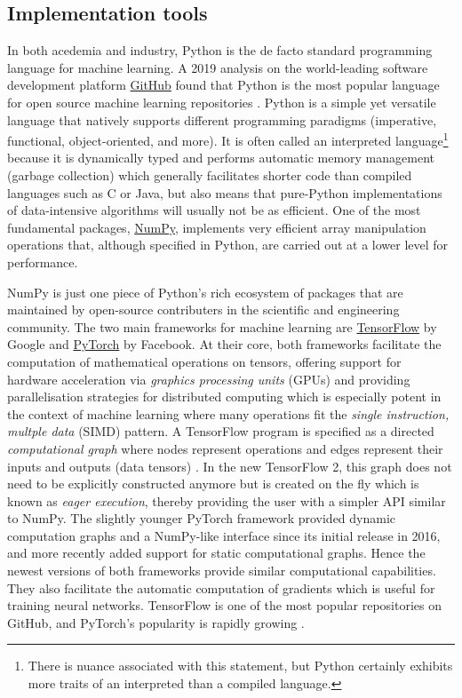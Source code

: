 \subsection{Implementation tools}
In both acedemia and industry, Python is the de facto standard programming language for machine learning. 
A 2019 analysis on the world-leading software development platform \href{https://www.github.com/}{GitHub} found that Python is the most popular language for open source machine learning repositories \cite{elliott2019}.
Python is a simple yet versatile language that natively supports different programming paradigms (imperative, functional, object-oriented, and more).
It is often called an interpreted language\footnote{There is nuance associated with this statement, but Python certainly exhibits more traits of an interpreted than a compiled language.} because it is dynamically typed and performs automatic memory management (garbage collection) which generally facilitates shorter code than compiled languages such as C or Java, but also means that pure-Python implementations of data-intensive algorithms will usually not be as efficient.
One of the most fundamental packages, \href{https://numpy.org/}{NumPy}, implements very efficient array manipulation operations that, although specified in Python, are carried out at a lower level for performance.

NumPy is just one piece of Python's rich ecosystem of packages that are maintained by open-source contributers in the scientific and engineering community.
The two main frameworks for machine learning are \href{https://www.tensorflow.org/}{TensorFlow} by Google and \href{https://www.pytorch.org/}{PyTorch} by Facebook. 
At their core, both frameworks facilitate the computation of mathematical operations on tensors, offering support for hardware acceleration via \textit{graphics processing units} (GPUs) and providing parallelisation strategies for distributed computing which is especially potent in the context of machine learning where many operations fit the \textit{single instruction, multple data} (SIMD) pattern.
A TensorFlow program is specified as a directed \textit{computational graph} where nodes represent operations and edges represent their inputs and outputs (data tensors) \cite{tensorflow2015whitepaper}.
In the new TensorFlow 2, this graph does not need to be explicitly constructed anymore but is created on the fly which is known as \textit{eager execution}, thereby providing the user with a simpler API similar to NumPy.
The slightly younger PyTorch framework provided dynamic computation graphs and a NumPy-like interface since its initial release in 2016, and more recently added support for static computational graphs.
Hence the newest versions of both frameworks provide similar computational capabilities.
They also facilitate the automatic computation of gradients which is useful for training neural networks. 
TensorFlow is one of the most popular repositories on GitHub, and PyTorch's popularity is rapidly growing \cite{github2019}.

